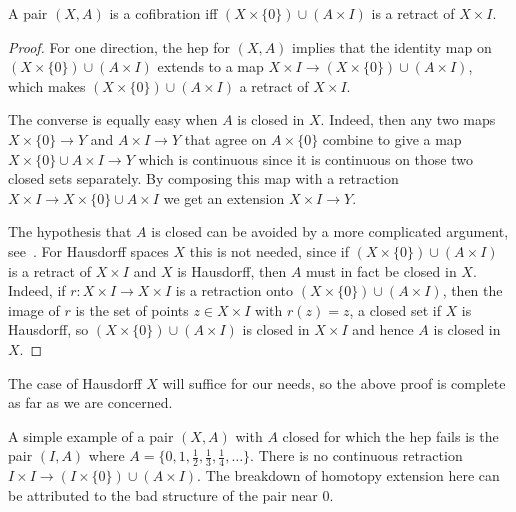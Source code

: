 \begin{lem}
    A pair $(X,A)$ is a cofibration iff $(X\times\{0\})\cup( A\times I)$ is a retract of $X\times I$.
\end{lem}
\begin{proof}
    For one direction, the \gls{hep} for $(X,A)$ implies that the identity map on $(X\times\{0\})\cup (A\times I)$ extends to a map $X\times I\to (X\times\{0\})\cup (A\times I)$, which makes $(X\times\{0\})\cup (A\times I)$ a retract of $X\times I$.

    The converse is equally easy when $A$ is closed in $X$. Indeed, then any two maps $X\times\{0\}\to Y$ and $A\times I\to Y$ that agree on $A\times\{0\}$ combine to give a map $X\times\{0\}\cup A\times I\to Y$ which is continuous since it is continuous on those two closed sets separately. By composing this map with a retraction $X\times I\to X\times\{0\}\cup A\times I$ we get an extension $X\times I\to Y$. 

    The hypothesis that $A$ is closed can be avoided by a more complicated argument, see~\cite[Prop.~A.18]{Hatcher}. For Hausdorff spaces $X$ this is not needed, since if $(X\times\{0\})\cup (A\times I)$ is a retract of $X\times I$ and $X$ is Hausdorff, then $A$ must in fact be closed in $X$. Indeed, if $r:X\times I\to X\times I$ is a retraction onto $(X\times\{0\})\cup (A\times I)$, then the image of $r$ is the set of points $z\in X\times I$ with $r(z)=z$, a closed set if $X$ is Hausdorff, so $(X\times\{0\})\cup (A\times I)$ is closed in $X\times I$ and hence $A$ is closed in $X$.
\end{proof}

The case of Hausdorff $X$ will suffice for our needs, so the above proof is complete as far as we are concerned.

\begin{example}
    A simple example of a pair $(X,A)$ with $A$ closed for which the \gls{hep} fails is the pair $(I,A)$ where $A=\{0,1,\frac12,\frac13,\frac14,\ldots\}$. There is no continuous retraction $I\times I\to (I\times\{0\})\cup (A\times I)$. The breakdown of homotopy extension here can be attributed to the bad structure of the pair near $0$.
\end{example}

